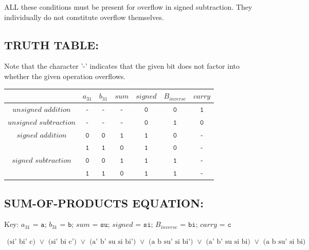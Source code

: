 \documentclass[a4paper]{article}
\begin{document}
ALL these conditions must be present for overflow in signed subtraction. They individually do not constitute overflow themselves.

\subsection*{TRUTH TABLE:}
Note that the character '-' indicates that the given bit does not factor into whether the given operation overflows.
\begin{center}
\begin{tabular}{|c|c|c|c|c|c|c|}
\hline
& $\textit{a}_{31}$ & $\textit{b}_{31}$ & $\textit{sum}$ & $\textit{signed}$ & $\textit{B}_{inverse}$ & $\textit{carry}$ \\
\hline
\hline
$\textit{unsigned addition}$ & $\texttt{-}$ & $\texttt{-}$ & $\texttt{-}$ & $\texttt{0}$ & $\texttt{0}$ & $\texttt{1}$ \\
\hline
\hline
$\textit{unsigned subtraction}$ & $\texttt{-}$ & $\texttt{-}$ & $\texttt{-}$ & $\texttt{0}$ & $\texttt{1}$ & $\texttt{0}$ \\
\hline
\hline
$\textit{signed addition}$ & $\texttt{0}$ & $\texttt{0}$ & $\texttt{1}$ & $\texttt{1}$ & $\texttt{0}$ & $\texttt{-}$ \\
\hline
 & $\texttt{1}$ & $\texttt{1}$ & $\texttt{0}$ & $\texttt{1}$ & $\texttt{0}$ & $\texttt{-}$ \\
\hline
\hline
$\textit{signed subtraction}$ & $\texttt{0}$ & $\texttt{0}$ & $\texttt{1}$ & $\texttt{1}$ & $\texttt{1}$ & $\texttt{-}$ \\
\hline
 & $\texttt{1}$ & $\texttt{1}$ & $\texttt{0}$ & $\texttt{1}$ & $\texttt{1}$ & $\texttt{-}$ \\
\hline
\end{tabular}
\end{center}

\subsection*{SUM-OF-PRODUCTS EQUATION:}

Key:  $\textit{a}_{31}$ = $\texttt{a}$; $\textit{b}_{31}$ = $\texttt{b}$; $\textit{sum}$ = $\texttt{su}$; $\textit{signed}$ = $\texttt{si}$; $\textit{B}_{inverse}$ = $\texttt{bi}$; $\textit{carry}$ = $\texttt{c}$

\begin{eqnarray*} 
\mbox{(si' bi' c) $\vee$ (si' bi c') $\vee$ (a' b' su si bi') $\vee$ (a b su' si bi') $\vee$ (a' b' su si bi) $\vee$ (a b su' si bi)} \\
\end{eqnarray*}
\end{document}
